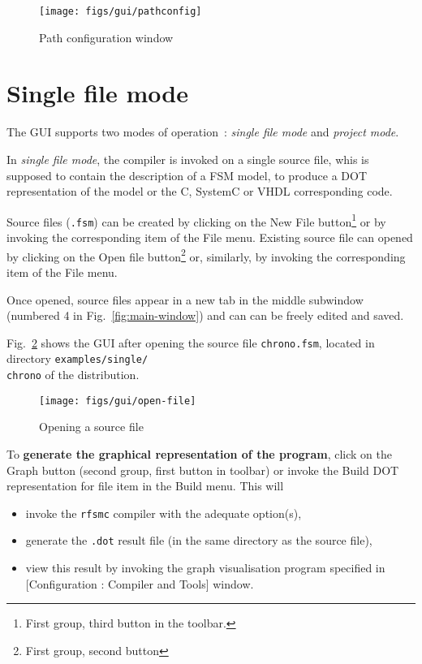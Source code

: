 \begin{figure}[h]
  \centering
  \texttt{[image: figs/gui/pathconfig]}
  \caption{Path configuration window}
  \label{fig:config-window}
\end{figure}

\section{Single file mode}
\label{sec:gui-single-file-mode}

The GUI supports two modes of operation~: \emph{single file mode} and \emph{project mode}. 

\medskip
In \emph{single file mode}, the compiler is invoked on a single source file, whis is supposed to
contain the description of a FSM model, to produce a DOT representation of the model or the C,
SystemC or VHDL corresponding code.

Source files (\verb|.fsm|) can be created by clicking on the \textsf{New File} button\footnote{First
  group, third button in the toolbar.} or by invoking the corresponding item of the \textsf{File}
menu. Existing source file can opened by clicking on the \textsf{Open file} button\footnote{First
  group, second button} or, similarly, by invoking the corresponding item of the \textsf{File} menu.

Once opened, source files appear in a new tab in the middle subwindow (numbered 4 in
Fig.~\ref{fig:main-window}) and can can be freely edited and saved. 

Fig.~\ref{fig:open-file} shows the GUI after
opening the source file \verb|chrono.fsm|, located in directory \texttt{examples/single/\\chrono} of
the distribution.

\begin{figure}[h]
  \centering
  \texttt{[image: figs/gui/open-file]}
  \caption{Opening a source file}
  \label{fig:open-file}
\end{figure}

\medskip
To \textbf{generate the graphical representation of the program}, click on the \textsf{Graph} button
(second group, first button in toolbar) or invoke the \textsf{Build DOT representation for file}
item in the \textsf{Build} menu. This will
\begin{itemize}
\item invoke the \verb|rfsmc| compiler with the adequate option(s),
\item generate the \texttt{.dot} result file (in the same directory as the source file),
\item view this result by invoking the graph visualisation program specified in 
  [\textsf{Configuration : Compiler and Tools}] window.
\end{itemize}


